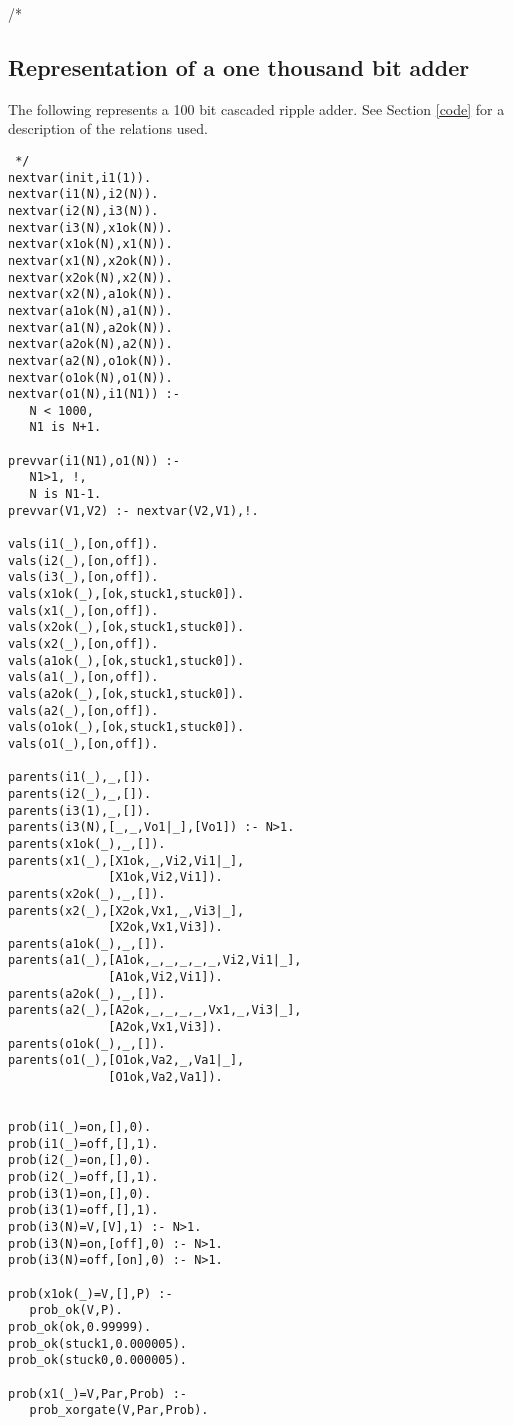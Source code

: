  /* 
\subsection{Representation of a one thousand bit adder}

The following represents a 100 bit cascaded ripple adder. See
Section \ref{code} for a description of the relations used.
\begin{verbatim} */
nextvar(init,i1(1)).
nextvar(i1(N),i2(N)).
nextvar(i2(N),i3(N)).
nextvar(i3(N),x1ok(N)).
nextvar(x1ok(N),x1(N)).
nextvar(x1(N),x2ok(N)).
nextvar(x2ok(N),x2(N)).
nextvar(x2(N),a1ok(N)).
nextvar(a1ok(N),a1(N)).
nextvar(a1(N),a2ok(N)).
nextvar(a2ok(N),a2(N)).
nextvar(a2(N),o1ok(N)).
nextvar(o1ok(N),o1(N)).
nextvar(o1(N),i1(N1)) :-
   N < 1000,
   N1 is N+1.

prevvar(i1(N1),o1(N)) :- 
   N1>1, !,
   N is N1-1.
prevvar(V1,V2) :- nextvar(V2,V1),!.

vals(i1(_),[on,off]).
vals(i2(_),[on,off]).
vals(i3(_),[on,off]).
vals(x1ok(_),[ok,stuck1,stuck0]).
vals(x1(_),[on,off]).
vals(x2ok(_),[ok,stuck1,stuck0]).
vals(x2(_),[on,off]).
vals(a1ok(_),[ok,stuck1,stuck0]).
vals(a1(_),[on,off]).
vals(a2ok(_),[ok,stuck1,stuck0]).
vals(a2(_),[on,off]).
vals(o1ok(_),[ok,stuck1,stuck0]).
vals(o1(_),[on,off]).

parents(i1(_),_,[]).
parents(i2(_),_,[]).
parents(i3(1),_,[]).
parents(i3(N),[_,_,Vo1|_],[Vo1]) :- N>1.
parents(x1ok(_),_,[]).
parents(x1(_),[X1ok,_,Vi2,Vi1|_],
              [X1ok,Vi2,Vi1]).
parents(x2ok(_),_,[]).
parents(x2(_),[X2ok,Vx1,_,Vi3|_],
              [X2ok,Vx1,Vi3]).
parents(a1ok(_),_,[]).
parents(a1(_),[A1ok,_,_,_,_,_,Vi2,Vi1|_],
              [A1ok,Vi2,Vi1]).
parents(a2ok(_),_,[]).
parents(a2(_),[A2ok,_,_,_,_,Vx1,_,Vi3|_],
              [A2ok,Vx1,Vi3]).
parents(o1ok(_),_,[]).
parents(o1(_),[O1ok,Va2,_,Va1|_],
              [O1ok,Va2,Va1]).


prob(i1(_)=on,[],0).
prob(i1(_)=off,[],1).
prob(i2(_)=on,[],0).
prob(i2(_)=off,[],1).
prob(i3(1)=on,[],0).
prob(i3(1)=off,[],1).
prob(i3(N)=V,[V],1) :- N>1.
prob(i3(N)=on,[off],0) :- N>1.
prob(i3(N)=off,[on],0) :- N>1.

prob(x1ok(_)=V,[],P) :-
   prob_ok(V,P).
prob_ok(ok,0.99999).
prob_ok(stuck1,0.000005).
prob_ok(stuck0,0.000005).

prob(x1(_)=V,Par,Prob) :-
   prob_xorgate(V,Par,Prob).


\end{verbatim}

